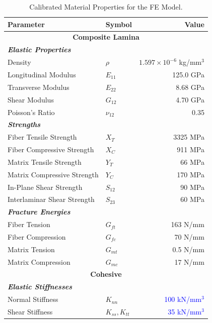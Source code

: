 \documentclass[
  preprint,
  12pt,
  a4paper
]{elsarticle}
\newcommand{\new}[1]{\textcolor{blue}{#1}}
\begin{document}
\begin{table}[htbp]
    \centering
    \caption{Calibrated Material Properties for the FE Model.}
    \label{tab:material_properties}
    \renewcommand{\arraystretch}{1.2}
    \begin{tabular}{l l r}
        \toprule
        \textbf{Parameter} & \textbf{Symbol} & \textbf{Value} \\
        \midrule
        \multicolumn{3}{c}{\textbf{Composite Lamina}} \\
        \textit{\textbf{Elastic Properties}} & & \\
        Density & $\rho$ & $1.597 \times 10^{-6}$ kg/mm$^3$ \\
        Longitudinal Modulus & $E_{11}$ & 125.0 GPa \\
        Transverse Modulus & $E_{22}$ & 8.68 GPa \\
        Shear Modulus & $G_{12}$ & 4.70 GPa \\
        Poisson's Ratio & $\nu_{12}$ & 0.35 \\
        
        \textit{\textbf{Strengths}} & & \\
        Fiber Tensile Strength & $X_T$ & 3325 MPa \\
        Fiber Compressive Strength & $X_C$ & 911 MPa \\
        Matrix Tensile Strength & $Y_T$ & 66 MPa \\
        Matrix Compressive Strength & $Y_C$ & 170 MPa \\
        In-Plane Shear Strength & $S_{12}$ & 90 MPa \\
        Interlaminar Shear Strength & $S_{23}$ & 60 MPa \\
        
        \textit{\textbf{Fracture Energies}} & & \\
        Fiber Tension & $G_{ft}$ & 163 N/mm \\
        Fiber Compression & $G_{fc}$ & 70 N/mm \\
        Matrix Tension & $G_{mt}$ & 0.5 N/mm \\
        Matrix Compression & $G_{mc}$ & 17 N/mm \\
        
        \midrule
        \multicolumn{3}{c}{\textbf{Cohesive}} \\
        \textit{\textbf{Elastic Stiffnesses}} & & \\
        Normal Stiffness & $K_{nn}$ & \new{100 kN/mm$^3$} \\
        Shear Stiffness & $K_{ss}, K_{tt}$ & \new{35 kN/mm$^3$} \\
        

\end{tabular}
\end{table}
\end{document}
